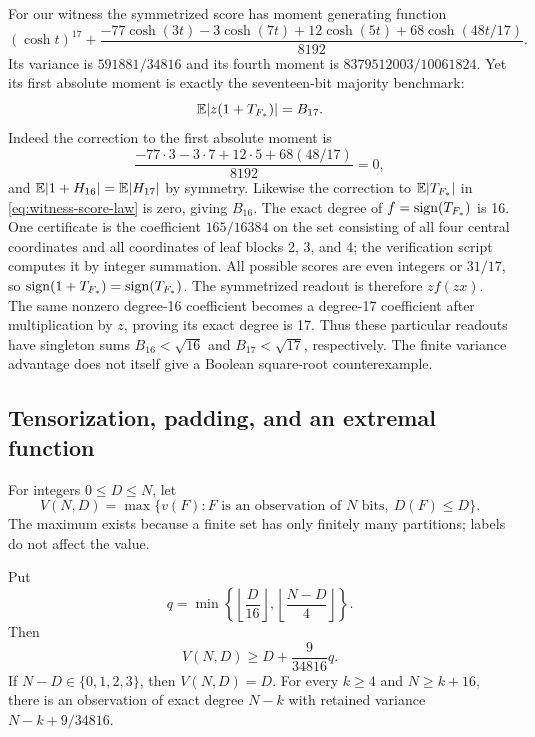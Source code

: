 For our witness the symmetrized score has moment generating function
\[
 (\cosh t)^{17}
 +\frac{-77\cosh(3t)-3\cosh(7t)
       +12\cosh(5t)+68\cosh(48t/17)}{8192}.
\]
Its variance is \(591881/34816\) and its fourth moment is
\(8379512003/10061824\). Yet its first absolute moment is exactly
the seventeen-bit majority benchmark:
\begin{equation}\label{eq:oddified-benchmark}
 \mathbb E|z(1+T_{F_*})|=B_{17}.
\end{equation}
Indeed the correction to the first absolute moment is
\[
 \frac{-77\cdot3-3\cdot7+12\cdot5+68(48/17)}{8192}=0,
\]
and \(\mathbb E|1+H_{16}|=\mathbb E|H_{17}|\) by symmetry.
Likewise the correction to \(\mathbb E|T_{F_*}|\) in
\eqref{eq:witness-score-law} is zero, giving \(B_{16}\).
The exact degree of \(f=\operatorname{sign}(T_{F_*})\) is 16. One certificate is
the coefficient \(165/16384\) on the set consisting of all four
central coordinates and all coordinates of leaf blocks 2, 3, and 4;
the verification script computes it by integer summation.
All possible scores are even integers or \(31/17\), so
\(\operatorname{sign}(1+T_{F_*})=\operatorname{sign}(T_{F_*})\). The symmetrized readout is therefore
\(z f(zx)\). The same nonzero degree-16 coefficient becomes a
degree-17 coefficient after multiplication by \(z\), proving its
exact degree is 17.
Thus these particular readouts have singleton sums \(B_{16}<\sqrt{16}\)
and \(B_{17}<\sqrt{17}\), respectively. The finite variance advantage
does not itself give a Boolean square-root counterexample.

\subsection{Tensorization, padding, and an extremal function}

\begin{definition}
For integers \(0\le D\le N\), let
\[
 V(N,D)=\max\{v(F):F\text{ is an observation of }N\text{ bits},
                  \ D(F)\le D\}.
\]
The maximum exists because a finite set has only finitely many
partitions; labels do not affect the value.
\end{definition}

\begin{theorem}\label{thm:tensor}
Put
\[
 q=\min\left\{\left\lfloor\frac D{16}\right\rfloor,
               \left\lfloor\frac{N-D}{4}\right\rfloor\right\}.
\]
Then
\begin{equation}\label{eq:extremal-lower}
 V(N,D)\ge D+\frac9{34816}q.
\end{equation}
If \(N-D\in\{0,1,2,3\}\), then \(V(N,D)=D\).
For every \(k\ge4\) and \(N\ge k+16\), there is an observation
of exact degree \(N-k\) with retained variance
\(N-k+9/34816\).
\end{theorem}


